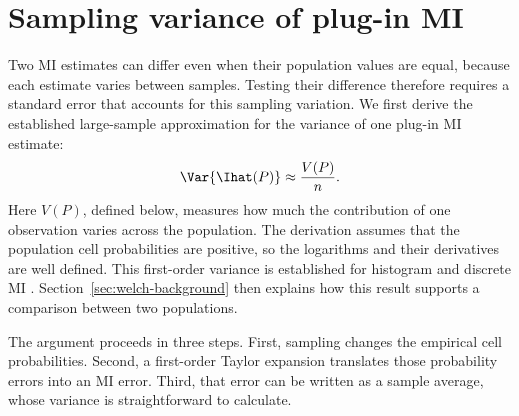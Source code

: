 \allowdisplaybreaks[0]
\section{Sampling variance of plug-in MI}
\label{sec:first-order-mi-background}

Two MI estimates can differ even when their population values are equal,
because each estimate varies between samples. Testing their difference
therefore requires a standard error that accounts for this sampling
variation. We first derive the established large-sample approximation
for the variance of one plug-in MI estimate:
\begin{equation}
  \Var\{\Ihat(P)\}\approx\frac{V(P)}{n}.
  \label{eq:first-order-mi-var-background}
\end{equation}
Here \(V(P)\), defined below, measures how much the contribution of one
observation varies across the population. The derivation assumes that the
population cell probabilities are positive, so the logarithms and their
derivatives are well defined. This first-order variance is established for
histogram and discrete MI \citep{moddemeijer1989,brillinger2004}.
Section~\ref{sec:welch-background} then explains how this result supports
a comparison between two populations.

The argument proceeds in three steps. First, sampling changes the empirical
cell probabilities. Second, a first-order Taylor expansion translates those
probability errors into an MI error. Third, that error can be written as a
sample average, whose variance is straightforward to calculate.

\medskip
{}

